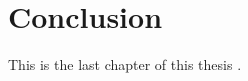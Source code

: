 %
\section{Conclusion}\label{sec:conclusion}
%
This is the last chapter of this thesis \cite{tur38}.
%
